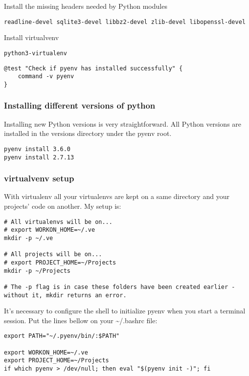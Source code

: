 \documentclass[11pt]{article}
\begin{document}
Install the missing headers needed by Python modules
\begin{verbatim}
readline-devel sqlite3-devel libbz2-devel zlib-devel libopenssl-devel
\end{verbatim}

Install virtualvenv
\begin{verbatim}
python3-virtualenv
\end{verbatim}

\begin{verbatim}
@test "Check if pyenv has installed successfully" {
    command -v pyenv
}
\end{verbatim}

\subsubsection{Installing different versions of python}
\label{sec:orgb219421}
Installing new Python versions is very straightforward. All Python versions are installed in the versions directory under the pyenv root.

\begin{verbatim}
pyenv install 3.6.0
pyenv install 2.7.13
\end{verbatim}

\subsubsection{virtualvenv setup}
\label{sec:org9062a4a}
With virtualenv all your virtualenvs are kept on a same directory and your projects' code on another. My setup is:
\begin{verbatim}
# All virtualenvs will be on...
# export WORKON_HOME=~/.ve
mkdir -p ~/.ve 

# All projects will be on...
# export PROJECT_HOME=~/Projects
mkdir -p ~/Projects 

# The -p flag is in case these folders have been created earlier - without it, mkdir returns an error.
\end{verbatim}

It's necessary to configure the shell to initialize pyenv when you start a terminal session. Put the lines bellow on your \textasciitilde{}/.bashrc file:
\begin{verbatim}
export PATH="~/.pyenv/bin/:$PATH"

export WORKON_HOME=~/.ve
export PROJECT_HOME=~/Projects
if which pyenv > /dev/null; then eval "$(pyenv init -)"; fi
\end{verbatim}
\end{document}
